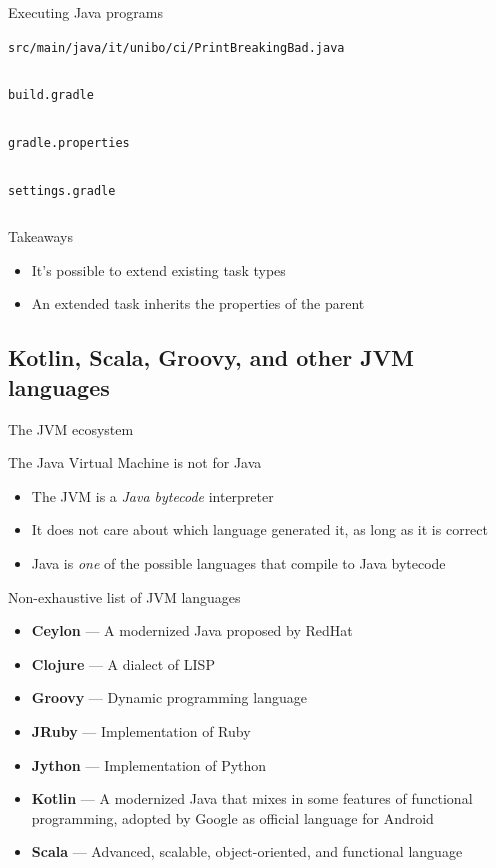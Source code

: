 \documentclass[presentation]{beamer}
\newcommand{\codefile}[4]{
	\begin{block}{\texttt{#2}}
		\inputminted[fontsize=#3,linenos=true,breaklines=true]{#4}{"workspace/#1/#2"}
	\end{block}
}
\newcommand{\java}[3]{\codefile{#1}{#2}{#3}{java}}
\newcommand{\groovy}[3]{\codefile{#1}{#2}{#3}{groovy}}
\begin{document}
\begin{frame}{Executing Java programs}
    \java{14-Execution}{src/main/java/it/unibo/ci/PrintBreakingBad.java}{\tiny}
    \groovy{14-Execution}{build.gradle}{\scriptsize}
    \groovy{14-Execution}{gradle.properties}{\scriptsize}
    \groovy{14-Execution}{settings.gradle}{\normalsize}
    \begin{block}{Takeaways}
        \begin{itemize}
            \item It's possible to extend existing task types
            \item An extended task inherits the properties of the parent
        \end{itemize}
    \end{block}
\end{frame}

\subsection{Kotlin, Scala, Groovy, and other JVM languages}

\begin{frame}[fragile]{The JVM ecosystem}
    \begin{block}{The Java Virtual Machine is not for Java}
        \begin{itemize}
            \item The JVM is a \textit{Java bytecode} interpreter
            \item It does not care about which language generated it, as long as it is correct
            \item Java is \textit{one} of the possible languages that compile to Java bytecode
        \end{itemize}
    \end{block}
    \begin{block}{Non-exhaustive list of JVM languages}
        \scriptsize
        \begin{itemize}
            \item \textbf{Ceylon} --- A modernized Java proposed by RedHat
            \item \textbf{Clojure} --- A dialect of LISP
            \item \textbf{Groovy} --- Dynamic programming language
            \item \textbf{JRuby} --- Implementation of Ruby
            \item \textbf{Jython} --- Implementation of Python
            \item \textbf{Kotlin} --- A modernized Java that mixes in some features of functional programming, adopted by Google as official language for Android
            \item \textbf{Scala} --- Advanced, scalable, object-oriented, and functional language
        \end{itemize}
    \end{block}
\end{frame}
\end{document}
